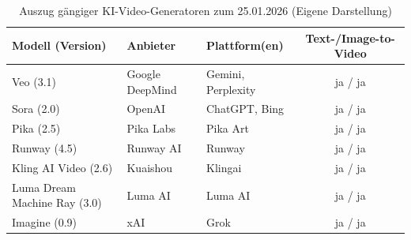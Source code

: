 \begin{table}[htbp]
	\centering
	\caption{Auszug gängiger KI-Video-Generatoren zum 25.01.2026 (Eigene Darstellung)}
	\label{tab:ki_video_generatoren}
	\begin{threeparttable}
		\begin{tabularx}{\textwidth}{>{\raggedright\arraybackslash}X >{\raggedright\arraybackslash}X >{\raggedright\arraybackslash}X c}
			\toprule
			\textbf{Modell (Version)} & \textbf{Anbieter} & \textbf{Plattform(en)} & \textbf{Text-/Image-to-Video} \\
			\midrule
			Veo (3.1) & Google DeepMind & Gemini, Perplexity & ja / ja \\
			Sora (2.0) & OpenAI & ChatGPT, Bing & ja / ja \\
			Pika (2.5) & Pika Labs & Pika Art & ja / ja \\
			Runway (4.5) & Runway AI & Runway & ja / ja \\
			Kling AI Video (2.6) & Kuaishou & Klingai & ja / ja \\
			Luma Dream Machine Ray (3.0) & Luma AI & Luma AI & ja / ja \\
			Imagine (0.9) & xAI & Grok & ja / ja \\
			\bottomrule
		\end{tabularx}
	\end{threeparttable}
\end{table}